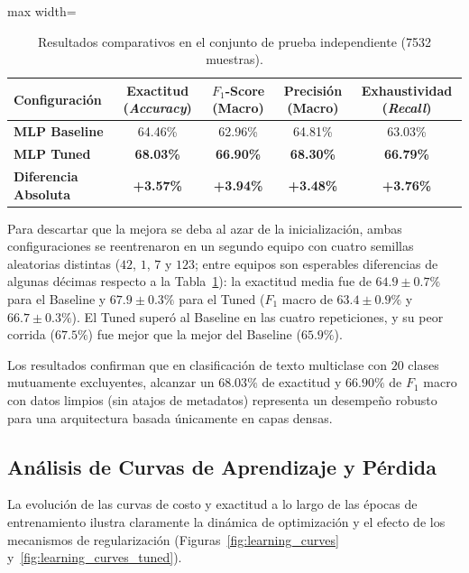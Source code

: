 \documentclass[12pt, a4paper]{article}
\begin{document}
\begin{table}[H]
    \centering
    \caption{Resultados comparativos en el conjunto de prueba independiente (7532 muestras).}
    \label{tab:test_metrics}
    \begin{adjustbox}{max width=\textwidth}
    \begin{tabular}{@{}lcccc@{}}
        \toprule
        \textbf{Configuración} & \textbf{Exactitud (\textit{Accuracy})} & \textbf{$F_1$-Score (Macro)} & \textbf{Precisión (Macro)} & \textbf{Exhaustividad (\textit{Recall})} \\
        \midrule
        \textbf{MLP Baseline}     & 64.46\% & 62.96\% & 64.81\% & 63.03\% \\
        \textbf{MLP Tuned}        & \textbf{68.03\%} & \textbf{66.90\%} & \textbf{68.30\%} & \textbf{66.79\%} \\
        \midrule
        \textbf{Diferencia Absoluta}& \textbf{+3.57\%} & \textbf{+3.94\%} & \textbf{+3.48\%} & \textbf{+3.76\%} \\
        \bottomrule
    \end{tabular}
    \end{adjustbox}
\end{table}

Para descartar que la mejora se deba al azar de la inicialización, ambas configuraciones se reentrenaron en un segundo equipo con cuatro semillas aleatorias distintas ($42$, $1$, $7$ y $123$; entre equipos son esperables diferencias de algunas décimas respecto a la Tabla~\ref{tab:test_metrics}): la exactitud media fue de $64.9 \pm 0.7\%$ para el Baseline y $67.9 \pm 0.3\%$ para el Tuned ($F_1$ macro de $63.4 \pm 0.9\%$ y $66.7 \pm 0.3\%$). El Tuned superó al Baseline en las cuatro repeticiones, y su peor corrida ($67.5\%$) fue mejor que la mejor del Baseline ($65.9\%$).

Los resultados confirman que en clasificación de texto multiclase con $20$ clases mutuamente excluyentes, alcanzar un $68.03\%$ de exactitud y $66.90\%$ de $F_1$ macro con datos limpios (sin atajos de metadatos) representa un desempeño robusto para una arquitectura basada únicamente en capas densas.

\subsection{Análisis de Curvas de Aprendizaje y Pérdida}

La evolución de las curvas de costo y exactitud a lo largo de las épocas de entrenamiento ilustra claramente la dinámica de optimización y el efecto de los mecanismos de regularización (Figuras~\ref{fig:learning_curves} y~\ref{fig:learning_curves_tuned}).
\end{document}
